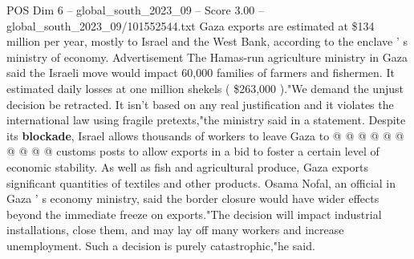 \begin{textsample}{POS Dim 6 – global\_south\_2023\_09 – Score 3.00 – global\_south\_2023\_09/101552544.txt}
Gaza exports are estimated at \$134 million per year, mostly to Israel and the West Bank, according to the enclave ' s ministry of economy.
Advertisement The Hamas-run agriculture ministry in Gaza said the Israeli move would impact 60,000 families of farmers and fishermen.
It estimated daily losses at one million shekels ( \$263,000 )."We demand the unjust decision be retracted.
It isn't based on any real justification and it violates the international law using fragile pretexts,"the ministry said in a statement.
Despite its \textbf{blockade}, Israel allows thousands of workers to leave Gaza to @ @ @ @ @ @ @ @ @ @ customs posts to allow exports in a bid to foster a certain level of economic stability.
As well as fish and agricultural produce, Gaza exports significant quantities of textiles and other products.
Osama Nofal, an official in Gaza ' s economy ministry, said the border closure would have wider effects beyond the immediate freeze on exports."The decision will impact industrial installations, close them, and may lay off many workers and increase unemployment.
Such a decision is purely catastrophic,"he said.

\end{textsample}
